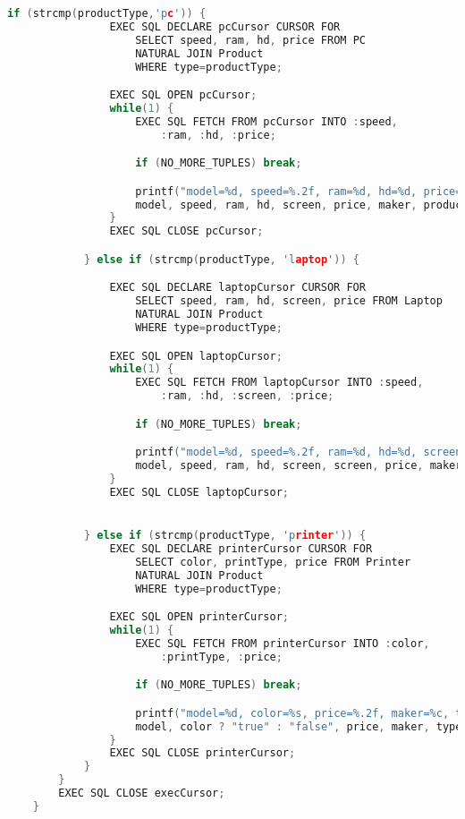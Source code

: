 \documentclass[12pt]{article}
\begin{document}
\begin{enumerate}[1.]
\begin{enumerate}[a)]
\begin{mdframed}
\begin{lstlisting}[language=c]
            if (strcmp(productType,'pc')) {
                EXEC SQL DECLARE pcCursor CURSOR FOR
                    SELECT speed, ram, hd, price FROM PC
                    NATURAL JOIN Product
                    WHERE type=productType;

                EXEC SQL OPEN pcCursor;
                while(1) {
                    EXEC SQL FETCH FROM pcCursor INTO :speed,
                        :ram, :hd, :price;

                    if (NO_MORE_TUPLES) break;

                    printf("model=%d, speed=%.2f, ram=%d, hd=%d, price=%.2f, maker=%c, type=%s",
                    model, speed, ram, hd, screen, price, maker, productType);
                }
                EXEC SQL CLOSE pcCursor;

            } else if (strcmp(productType, 'laptop')) {

                EXEC SQL DECLARE laptopCursor CURSOR FOR
                    SELECT speed, ram, hd, screen, price FROM Laptop
                    NATURAL JOIN Product
                    WHERE type=productType;

                EXEC SQL OPEN laptopCursor;
                while(1) {
                    EXEC SQL FETCH FROM laptopCursor INTO :speed,
                        :ram, :hd, :screen, :price;

                    if (NO_MORE_TUPLES) break;

                    printf("model=%d, speed=%.2f, ram=%d, hd=%d, screen=%d, price=%.2f, maker=%c, type=%s",
                    model, speed, ram, hd, screen, screen, price, maker, productType);
                }
                EXEC SQL CLOSE laptopCursor;


            } else if (strcmp(productType, 'printer')) {
                EXEC SQL DECLARE printerCursor CURSOR FOR
                    SELECT color, printType, price FROM Printer
                    NATURAL JOIN Product
                    WHERE type=productType;

                EXEC SQL OPEN printerCursor;
                while(1) {
                    EXEC SQL FETCH FROM printerCursor INTO :color,
                        :printType, :price;

                    if (NO_MORE_TUPLES) break;

                    printf("model=%d, color=%s, price=%.2f, maker=%c, type=%s",
                    model, color ? "true" : "false", price, maker, type);
                }
                EXEC SQL CLOSE printerCursor;
            }
        }
        EXEC SQL CLOSE execCursor;
    }
    \end{lstlisting}



\end{mdframed}
\end{enumerate}
\end{enumerate}
\end{document}
